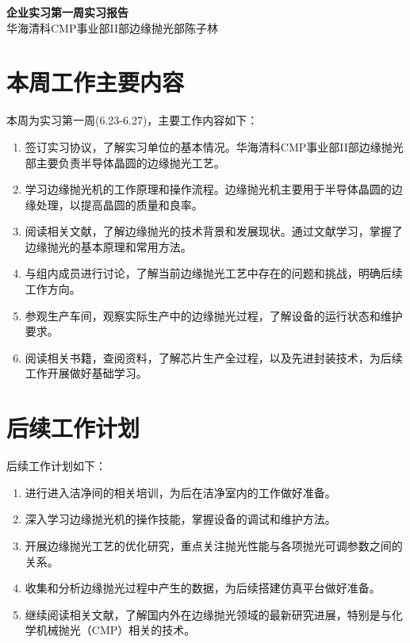 \documentclass[11pt]{article}
\begin{document}
\begin{center}
    \LARGE \textbf{企业实习\;第一周实习报告}\\
    \vspace{10pt}
    \normalsize 华海清科CMP事业部II部边缘抛光部\;\;陈子林
\end{center}

\section{本周工作主要内容}
本周为实习第一周(6.23-6.27)，主要工作内容如下：
\begin{enumerate}
    \item 签订实习协议，了解实习单位的基本情况。华海清科CMP事业部II部边缘抛光部主要负责半导体晶圆的边缘抛光工艺。
    \item 学习边缘抛光机的工作原理和操作流程。边缘抛光机主要用于半导体晶圆的边缘处理，以提高晶圆的质量和良率。
    \item 阅读相关文献，了解边缘抛光的技术背景和发展现状。通过文献学习，掌握了边缘抛光的基本原理和常用方法。
    \item 与组内成员进行讨论，了解当前边缘抛光工艺中存在的问题和挑战，明确后续工作方向。
    \item 参观生产车间，观察实际生产中的边缘抛光过程，了解设备的运行状态和维护要求。
    \item 阅读相关书籍，查阅资料，了解芯片生产全过程，以及先进封装技术，为后续工作开展做好基础学习。
\end{enumerate}

\section{后续工作计划}
后续工作计划如下：
\begin{enumerate}
    \item 进行进入洁净间的相关培训，为后在洁净室内的工作做好准备。
    \item 深入学习边缘抛光机的操作技能，掌握设备的调试和维护方法。
    \item 开展边缘抛光工艺的优化研究，重点关注抛光性能与各项抛光可调参数之间的关系。
    \item 收集和分析边缘抛光过程中产生的数据，为后续搭建仿真平台做好准备。
    \item 继续阅读相关文献，了解国内外在边缘抛光领域的最新研究进展，特别是与化学机械抛光（CMP）相关的技术。
\end{enumerate}
\end{document}
